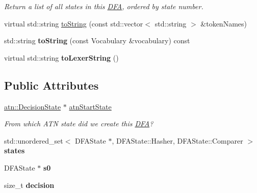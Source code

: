 \begin{DoxyCompactItemize}
\begin{DoxyCompactList}\small\item\em Return a list of all states in this \hyperlink{classantlr4_1_1dfa_1_1DFA}{D\+FA}, ordered by state number. \end{DoxyCompactList}\item 
virtual std\+::string \hyperlink{classantlr4_1_1dfa_1_1DFA_adae4f569d3075101ae3571fe67748b56}{to\+String} (const std\+::vector$<$ std\+::string $>$ \&token\+Names)
\item 
\mbox{\label{classantlr4_1_1dfa_1_1DFA_a47082a53818c84418ed873c64b7d2951}} 
std\+::string {\bfseries to\+String} (const Vocabulary \&vocabulary) const
\item 
\mbox{\label{classantlr4_1_1dfa_1_1DFA_a17f180730ab4ac077e4811665ec1e0e0}} 
virtual std\+::string {\bfseries to\+Lexer\+String} ()
\end{DoxyCompactItemize}
\subsection*{Public Attributes}
\begin{DoxyCompactItemize}
\item 
\hyperlink{classantlr4_1_1atn_1_1DecisionState}{atn\+::\+Decision\+State} $\ast$ \hyperlink{classantlr4_1_1dfa_1_1DFA_a83d51316351c6939e7d249dc20b5c9c8}{atn\+Start\+State}
\begin{DoxyCompactList}\small\item\em From which A\+TN state did we create this \hyperlink{classantlr4_1_1dfa_1_1DFA}{D\+FA}? \end{DoxyCompactList}\item 
\mbox{\label{classantlr4_1_1dfa_1_1DFA_a287490e94942bf6355b041e13b4fcc1c}} 
std\+::unordered\+\_\+set$<$ D\+F\+A\+State $\ast$, D\+F\+A\+State\+::\+Hasher, D\+F\+A\+State\+::\+Comparer $>$ {\bfseries states}
\item 
\mbox{\label{classantlr4_1_1dfa_1_1DFA_a42e1ce8d87cbfb6156a6bff4fd86ed32}} 
D\+F\+A\+State $\ast$ {\bfseries s0}
\item 
\mbox{\label{classantlr4_1_1dfa_1_1DFA_afaf75312829a34946e8e69b07748a230}} 
size\+\_\+t {\bfseries decision}
\end{DoxyCompactItemize}


